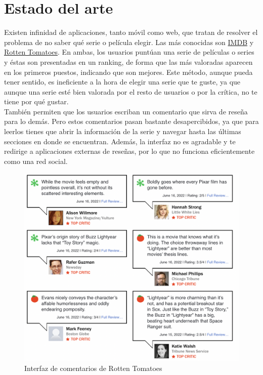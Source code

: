 \chapter{Estado del arte}

Existen infinidad de aplicaciones, tanto móvil como web, que tratan de resolver el problema de no saber qué serie o película elegir. Las más conocidas son \href{https://www.imdb.com}{IMDB} y \href{https://www.rottentomatoes.com}{Rotten Tomatoes}. En ambas, los usuarios puntúan una serie de películas o series y éstas son presentadas en un ranking, de forma que las más valoradas aparecen en los primeros puestos, indicando que son mejores. Este método, aunque pueda tener sentido, es ineficiente a la hora de elegir una serie que te guste, ya que aunque una serie esté bien valorada por el resto de usuarios o por la crítica, no te tiene por qué gustar. \\

También permiten que los usuarios escriban un comentario que sirva de reseña para lo demás. Pero estos comentarios pasan bastante desapercibidos, ya que para leerlos tienes que abrir la información de la serie y navegar hasta las últimas secciones en donde se encuentran. Además, la interfaz no es agradable y te redirige a aplicaciones externas de reseñas, por lo que no funciona eficientemente como una red social.\\
\begin{figure}[H]
    \centering	
    \includegraphics[scale=0.25]{img/rotten-tomatoes-comments.png}
    \caption{ Interfaz de comentarios de Rotten Tomatoes }
    \label{fig:rotten_tomatoes}
\end{figure}

